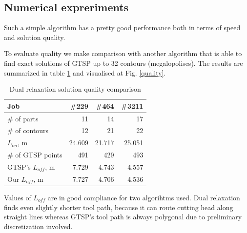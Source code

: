 \documentclass{../download/tPRS2e}
\begin{document}
\subsection{Numerical expreriments}

Such a simple algorithm has a pretty good performance
both in terms of speed and solution quality.

To evaluate quality
we make comparison with another algorithm
that is able to find exact solutions of GTSP
up to 32 contours (megalopolises).
The results are summarized in table \ref{exact-3}
and visualised at Fig. \ref{quality}.

\begin{table}[h]
    \begin{center}    
    \begin{tabular}{l|*{3}{r}}
        Job & \#229 & \#464 & \#3211 \\
        \hline
        \# of parts & 11 & 14 & 17\\
        \# of contours & 12 & 21 & 22 \\
        $L_{on}$, m & 24.609 & 21.717 & 25.051 \\
        \# of GTSP points & 491 & 429 & 493 \\
        GTSP's $L_{off}$, m & 7.729 & 4.743 & 4.557 \\
        Our $L_{off}$, m & 7.727 & 4.706 & 4.536 \\
    \end{tabular}
    \caption{Dual relaxation solution quality comparison}
    \label{exact-3}
    \end{center}
    \end{table}

Values of $L_{off}$ are in good compliance for two algorihtms used.
Dual relaxation finds even slightly shorter tool path,
because it can route cutting head along straight lines
whereas GTSP's tool path is always polygonal
due to preliminary discretization involved.
\end{document}
